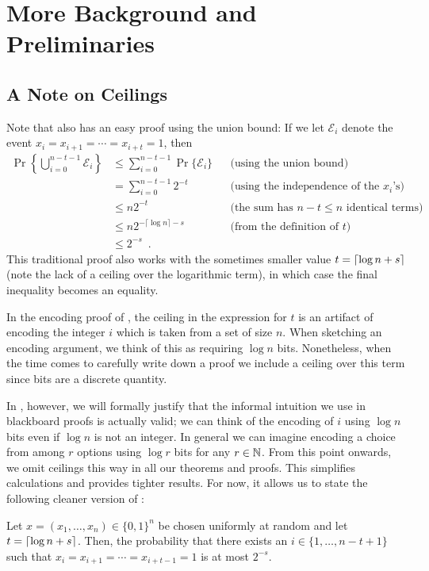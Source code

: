 \documentclass[prodmode,acmcsur]{acmsmall}
\newenvironment{customthm}[1]
  {\renewcommand\theinnercustomthm{#1}\innercustomthm}
  {\endinnercustomthm}
\begin{document}
\section{More Background and Preliminaries}
\subsection{A Note on Ceilings}

Note that  also has an easy proof using the union
bound: If we let $\mathcal{E}_i$ denote the event
$x_i=x_{i+1}=\cdots=x_{i+t}=1$, then
\begin{align*}
  \Pr \left\{\bigcup_{i=0}^{n-t-1} \mathcal{E}_i\right\}
  & \le \sum_{i=0}^{n-t-1} \Pr \{\mathcal{E}_i\} && \text{(using the union bound)}\\
  & = \sum_{i=0}^{n-t-1} 2^{-t}  &&\text{(using the independence of the $x_i$'s)}\\
  & \le n2^{-t} && \text{(the sum has $n-t\le n$ identical terms)}\\
  & \le n2^{-\lceil\log n\rceil-s}&& \text{(from the definition of $t$)}\\
  & \le 2^{-s} \enspace .
\end{align*}
This traditional proof also works with the sometimes smaller value
$t={\lceil \log n+s \rceil}$ (note the lack of a ceiling over the logarithmic
term), in which case the final inequality becomes an equality.

In the encoding proof of , the ceiling in the
expression for $t$ is an artifact of encoding the integer $i$ which is
taken from a set of size $n$. When sketching an encoding argument, we
think of this as requiring $\log n$ bits. Nonetheless, when 
 the time comes to carefully write down a
proof we include a ceiling over this term since bits are a discrete
quantity.

In , however, we will 
formally justify that the informal
intuition we use in blackboard proofs is actually valid; we can think
of the encoding of $i$ using $\log n$ bits even if $\log n$ is not an
integer.  In general we can imagine encoding a choice from among $r$
options using $\log r$ bits for any $r\in\mathbb{N}$.  From this point
onwards, we omit ceilings this way in all our theorems and
proofs. This simplifies calculations and provides tighter results.
For now, it allows us to state the following cleaner version of
:

\begin{customthm}{\ref*{thm:runs-i}b}
  Let $x=(x_1,\ldots,x_n)\in\{0,1\}^n$ be chosen uniformly at random
  and let $t = {\lceil \log n + s \rceil}$. Then, the probability that there
  exists an $i\in\{1,\ldots,n-t+1\}$ such that
  $x_i=x_{i+1}=\cdots=x_{i+t-1}=1$ is at most $2^{-s}$.
\end{customthm}
\end{document}
